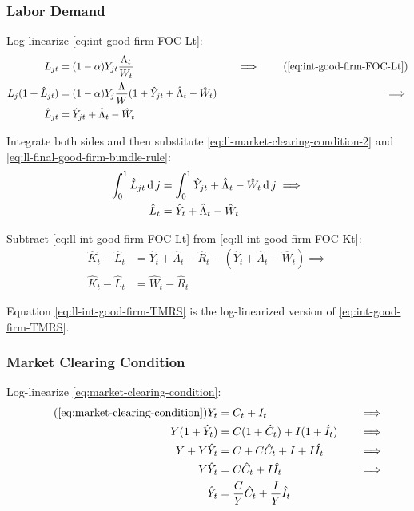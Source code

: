 \documentclass[
	thesis.tex
	]{subfiles}
\begin{document}

\subsubsection{Labor Demand}

Log-linearize \ref{eq:int-good-firm-FOC-Lt}:
\begin{alignat}{2}
	L_{jt} &= (1-\alpha) Y_{jt} \frac{\Lambda_t}{W_t} &\implies \tag{\ref{eq:int-good-firm-FOC-Lt}} \\
	L_j (1+ \hat{L}_{jt}) &= (1-\alpha) Y_{j} \frac{\Lambda}{W} (1+ \hat{Y}_{jt} +\hat{\Lambda}_t -\hat{W}_t) \quad &\implies \nonumber \\
	\hat{L}_{jt} &= \hat{Y}_{jt} +\hat{\Lambda}_t -\hat{W}_t \nonumber
\end{alignat}

Integrate both sides and then substitute \ref{eq:ll-market-clearing-condition-2} and \ref{eq:ll-final-good-firm-bundle-rule}:
\begin{align}
	\int_{0}^{1} \hat{L}_{jt} \operatorname{d} j &= \int_{0}^{1} \hat{Y}_{jt} + \hat{\Lambda}_t - \hat{W}_t \operatorname{d} j \implies \nonumber \\
	\hat{L}_t &= \hat{Y}_t + \hat{\Lambda}_t - \hat{W}_t
	\label{eq:ll-int-good-firm-FOC-Lt}
\end{align}

Subtract \ref{eq:ll-int-good-firm-FOC-Lt} from \ref{eq:ll-int-good-firm-FOC-Kt}:
\begin{align}
	\hat{K}_t - \hat{L}_t &= \hat{Y}_t + \hat{\Lambda}_t - \hat{R}_t - (\hat{Y}_t + \hat{\Lambda}_t - \hat{W}_t) \implies \nonumber \\
	\hat{K}_t - \hat{L}_t &= \hat{W}_t - \hat{R}_t \label{eq:ll-int-good-firm-TMRS}
\end{align}

Equation \ref{eq:ll-int-good-firm-TMRS} is the log-linearized version of \ref{eq:int-good-firm-TMRS}.


\subsubsection{Market Clearing Condition}

Log-linearize \ref{eq:market-clearing-condition}:
\begin{alignat}{2}
	\tag{\ref{eq:market-clearing-condition}}
	Y_t &= C_t + I_t &\implies \\
	Y (1+ \hat{Y}_t) &= C(1+ \hat{C}_t) + I (1+ \hat{I}_t) \quad &\implies \nonumber \\
	Y + Y\hat{Y}_t &= C + C\hat{C}_t + I + I\hat{I}_t &\implies \nonumber  \\
	Y\hat{Y}_t &= C\hat{C}_t + I\hat{I}_t &\implies \nonumber \\
	\hat{Y}_t &= \frac{C}{Y}\hat{C}_t + \frac{I}{Y}\hat{I}_t  \label{eq:ll-market-clearing-condition}
\end{alignat}
\end{document}
